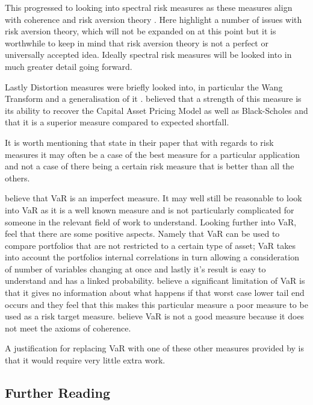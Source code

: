 \documentclass[12pt,a4paper]{article}
\begin{document}
This progressed to looking into spectral risk measures as these measures align with coherence and risk aversion theory \citep{dowd2006after}. Here \cite{dowd2006after} highlight a number of issues with risk aversion theory, which will not be expanded on at this point but it is worthwhile to keep in mind that risk aversion theory is not a perfect or universally accepted idea. Ideally spectral risk measures will be looked into in much greater detail going forward.

Lastly Distortion measures were briefly looked into, in particular the Wang Transform and a generalisation of it  \citep{dowd2006after}. \cite{dowd2006after} believed that a strength of this measure is its ability to recover the Capital Asset Pricing Model as well as Black-Scholes and that it is a superior measure compared to expected shortfall.
 
It is worth mentioning that \cite{dowd2006after} state in their paper that with regards to risk measures it may often be a case of the best measure for a particular application and not a case of there being a certain risk measure that is better than all the others. 

\cite{dowd2006after} believe that VaR is an imperfect measure. It may well still be reasonable to look into VaR as it is a well known measure and is not particularly complicated for someone in the relevant field of work to understand. Looking further into VaR, \cite{dowd2006after} feel that there are some positive aspects. Namely that VaR can be used to compare portfolios that are not restricted to a certain type of asset; VaR takes into account the portfolios internal correlations in turn allowing a consideration of number of variables changing at once and lastly it's result is easy to understand and has a linked probability.  \cite{dowd2006after} believe a significant limitation of VaR is that it gives no information about what happens if that worst case lower tail end occurs and they feel that this makes this particular measure a poor measure to be used as a risk target measure. \cite{ACERBI20021505} believe VaR is not a good measure because it does not meet the axioms of coherence.


A justification for replacing VaR with one of these other measures provided by \cite{dowd2006after} is that it would require very little extra work. 

\subsection{Further Reading}
\label{subsec:FurRead}
\end{document}
